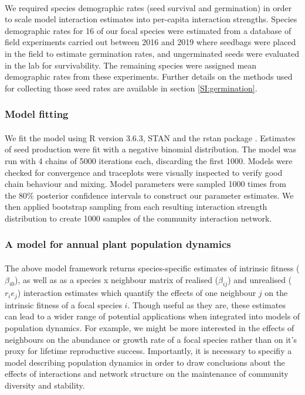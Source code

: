\documentclass[a4,12pt]{article}
\begin{document}
        \paragraph{} 
        We required species demographic rates (seed survival and germination) in order to scale model interaction estimates into per-capita interaction strengths. Species demographic rates for 16 of our focal species were estimated from a database of field experiments carried out between 2016 and 2019 where seedbags were placed in the field to estimate germination rates, and ungerminated seeds were evaluated in the lab for survivability.  The remaining species were assigned mean demographic rates from these experiments. Further details on the methods used for collecting those seed rates are available in section \ref{SI:germination}.

        \subsubsection{Model fitting}

        \paragraph{}
        We fit the model using R version 3.6.3, STAN and the rstan package \parencite{R2020, Carpenter2017, Rstan2020}. Estimates of seed production were fit with a negative binomial distribution. The model was run with 4 chains of 5000 iterations each, discarding the first 1000. Models were checked for convergence and traceplots were visually inspected to verify good chain behaviour and mixing. Model parameters were sampled 1000 times from the 80\% posterior confidence intervals to construct our parameter estimates. We then applied bootstrap sampling from each resulting interaction strength distribution to create 1000 samples of the community interaction network.

        \subsubsection{A model for annual plant population dynamics}
        \label{SI:popdyn}

        \paragraph{}
        The above model framework returns species-specific estimates of intrinsic fitness ($\beta_{i0}$), as well as as a species x neighbour matrix of realised ($\beta_{ij}$) and unrealised ($r_i e_j$) interaction estimates which quantify the effects of one neighbour $j$ on the intrinsic fitness of a focal species $i$. Though useful as they are, these estimates can lead to a wider range of potential applications when integrated into models of population dynamics. For example, we might be more interested in the effects of neighbours on the abundance or growth rate of a focal species rather than on it's proxy for lifetime reproductive success. Importantly, it is necessary to specifiy a model describing population dynamics in order to draw conclusions about the effects of interactions and network structure on the maintenance of community diversity and stability. 
\end{document}
